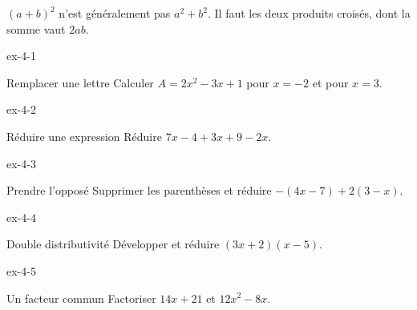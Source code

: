 \begin{attention}$(a+b)^2$ n’est généralement pas $a^2+b^2$. Il faut les deux produits croisés, dont la somme vaut $2ab$.\end{attention}
\clearpage{}
\begin{blocLivre}{ex-4-1}\begin{exercice}[1]{Remplacer une lettre}
Calculer $A=2x^2-3x+1$ pour $x=-2$ et pour $x=3$.
\end{exercice}\end{blocLivre}
\begin{blocLivre}{ex-4-2}\begin{exercice}[1]{Réduire une expression}
Réduire $7x-4+3x+9-2x$.
\end{exercice}\end{blocLivre}
\begin{blocLivre}{ex-4-3}\begin{exercice}[1]{Prendre l’opposé}
Supprimer les parenthèses et réduire $-(4x-7)+2(3-x)$.
\end{exercice}\end{blocLivre}
\begin{blocLivre}{ex-4-4}\begin{exercice}[1]{Double distributivité}
Développer et réduire $(3x+2)(x-5)$.
\end{exercice}\end{blocLivre}
\begin{blocLivre}{ex-4-5}\begin{exercice}[1]{Un facteur commun}
Factoriser $14x+21$ et $12x^2-8x$.
\end{exercice}\end{blocLivre}


